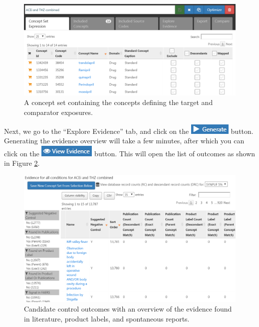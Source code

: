 \documentclass[11pt]{book}
\theoremstyle{definition}
\theoremstyle{definition}
\theoremstyle{definition}
\theoremstyle{remark}
\begin{document}
\begin{figure}

{\centering \includegraphics[width=1\linewidth]{images/MethodValidity/exposuresConceptSet} 

}

\caption{A concept set containing the concepts defining the target and comparator exposures.}\label{fig:exposuresConceptSet}
\end{figure}

Next, we go to the ``Explore Evidence'' tab, and click on the \includegraphics{images/MethodValidity/generate.png} button. Generating the evidence overview will take a few minutes, after which you can click on the \includegraphics{images/MethodValidity/viewEvidence.png} button. This will open the list of outcomes as shown in Figure \ref{fig:candidateNcs}.

\begin{figure}

{\centering \includegraphics[width=1\linewidth]{images/MethodValidity/candidateNcs} 

}

\caption{Candidate control outcomes with an overview of the evidence found in literature, product labels, and spontaneous reports.}\label{fig:candidateNcs}
\end{figure}
\end{document}
